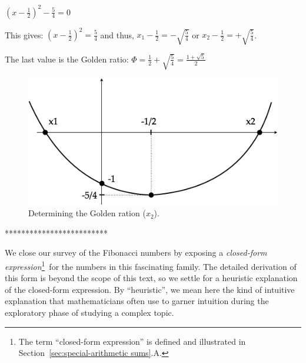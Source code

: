 $(x-\frac{1}{2})^2 - \frac{5}{4} = 0$

This gives: $(x-\frac{1}{2})^2 = \frac{5}{4}$ and thus, $x_1-\frac{1}{2} = - \sqrt{\frac{5}{4}}$ or $x_2-\frac{1}{2} = + \sqrt{\frac{5}{4}}$.

The last value is the Golden ratio: $\Phi = \frac{1}{2} + \sqrt{\frac{5}{4}} = \frac{1+\sqrt{5}}{2}$

\begin{figure}[htb]
\begin{center}
       \includegraphics[scale=0.3]{FiguresArithmetic/SecondDegreeFibo}
\caption{Determining the Golden ration ($x_2$).}
\label{fig:SecondDegreeFibo}
\end{center}
\end{figure}
*************************


We close our survey of the Fibonacci numbers by exposing a {\it
  closed-form expression}\footnote{The term ``closed-form expression''
  is defined and illustrated in Section~\ref{sec:special-arithmetic
    sums}.A.}~for the numbers in this fascinating family.  The
detailed derivation of this form is beyond the scope of this text, so
we settle for a heuristic explanation of the closed-form expression.
By ``heuristic'', we mean here the kind of intuitive explanation that
mathematicians often use to garner intuition during the exploratory
phase of studying a complex topic. 

